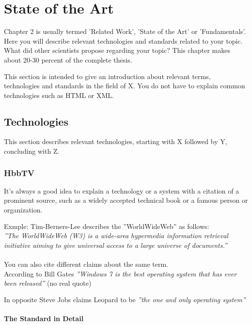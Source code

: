\chapter{State of the Art\label{cha:chapter2}}

Chapter 2 is usually termed 'Related Work', 'State of the Art' or 'Fundamentals'. Here you will describe
relevant technologies and standards related to your topic. What did other scientists propose regarding
your topic? This chapter makes about 20-30 percent of the complete thesis.

This section is intended to give an introduction about relevant terms, technologies
and standards in the field of X. You do not have to explain common technologies such
as HTML or XML.

\section{Technologies \label{sec:tech}}

This section describes relevant technologies, starting with X followed by Y, concluding with Z.

\subsection{HbbTV\label{sec:hbbtv}}

It's always a good idea to explain a technology or a system with a citation of a prominent
source, such as a widely accepted technical book or a famous person or organization.

Exmple: Tim-Berners-Lee describes the ''WorldWideWeb'' as follows:\\
\textit{''The WorldWideWeb (W3) is a wide-area hypermedia information retrieval initiative
aiming to give universal access to a large universe of documents.''} \cite{timwww}\\
\\
You can also cite different claims about the same term.\\

According to Bill Gates
\textit{''Windows 7 is the best operating system that has ever been released''} \cite{billgates} (no real quote)

In opposite Steve Jobs claims Leopard to be
\textit{''the one and only operating system''} \cite{stevejobs}

\subsubsection{The Standard in Detail\label{sec:hbbtvstandard}}

